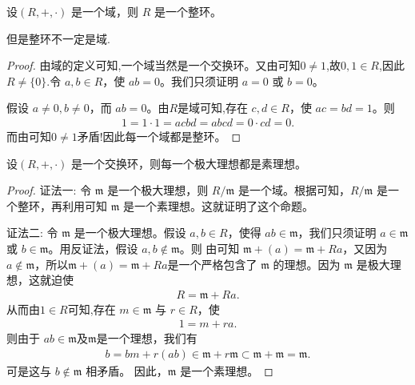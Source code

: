 \documentclass[../../main.tex]{subfiles}
\begin{document}
\begin{lemma}[域一定是整环]\label{lemma:域一定是整环}
设$(R, +, \cdot)$ 是一个域，则 $R$ 是一个整环。
\end{lemma}
\begin{remark}
但是整环不一定是域.
\end{remark}
\begin{proof}
由域的定义可知,一个域当然是一个交换环。又由可知$0\ne 1$,故$0,1\in R$,因此$R\ne \{0\}.$令 $a, b \in R$，使 $ab = 0$。我们只须证明 $a = 0$ 或 $b = 0$。

假设 $a \neq 0, b \neq 0$，而 $ab = 0$。由$R$是域可知,存在 $c, d \in R$，使 $ac = bd = 1$。则
\begin{align*}
1 = 1 \cdot 1 = acbd = abcd = 0 \cdot cd = 0.
\end{align*}
而由可知$0\ne 1$矛盾!因此每一个域都是整环。

\end{proof}

\begin{proposition}\label{proposition:在交换环中,每一个极大理想都是素理想}
设$(R, +, \cdot)$ 是一个交换环，则每一个极大理想都是素理想。
\end{proposition}
\begin{proof}
{\color{blue}证法一:}
令 $\mathfrak{m}$ 是一个极大理想，则 $R / \mathfrak{m}$ 是一个域。根据可知，$R / \mathfrak{m}$ 是一个整环，再利用可知 $\mathfrak{m}$ 是一个素理想。这就证明了这个命题。

{\color{blue}证法二:}
令 $\mathfrak{m}$ 是一个极大理想。假设 $a, b \in R$，使得 $ab \in \mathfrak{m}$，我们只须证明 $a \in \mathfrak{m}$ 或 $b \in \mathfrak{m}$。用反证法，假设 $a, b \notin \mathfrak{m}$。则 由可知 $\mathfrak{m}+(a)=\mathfrak{m} + Ra $，又因为 $a \notin \mathfrak{m}$，所以$\mathfrak{m}+(a)=\mathfrak{m} + Ra $是一个严格包含了 $\mathfrak{m}$ 的理想。因为 $\mathfrak{m}$ 是极大理想，这就迫使
\begin{align*}
R = \mathfrak{m} + Ra .
\end{align*}
从而由$1\in R$可知,存在 $m \in \mathfrak{m}$ 与 $r \in R$，使
\begin{align*}
1 = m + ra .
\end{align*}
则由于 $ab \in \mathfrak{m}$及$\mathfrak{m}$是一个理想，我们有
\begin{align*}
b = bm + r(ab) \in \mathfrak{m} + r\mathfrak{m} \subset \mathfrak{m} + \mathfrak{m} = \mathfrak{m} .
\end{align*}
可是这与 $b \notin \mathfrak{m}$ 相矛盾。
因此，$\mathfrak{m}$ 是一个素理想。 

\end{proof}
\end{document}
